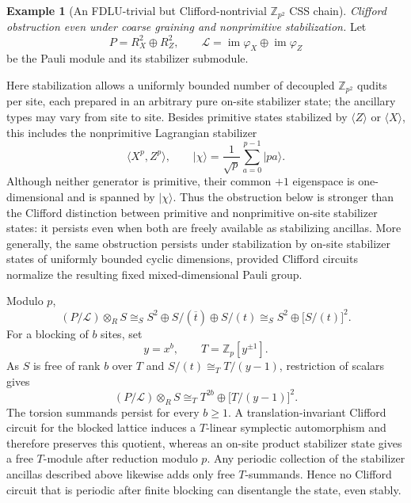 \documentclass[aps,prx,english,superscriptaddress,twocolumn,tightenlines,showpacs,longbibliography,floatfix,amsfonts]{revtex4-2}
\theoremstyle{remark}
\theoremstyle{definition}
\newtheorem{example}{Example}
\begin{document}
\begin{example}[An FDLU-trivial but Clifford-nontrivial \(\mathbb Z_{p^2}\) CSS chain]
	\emph{Clifford obstruction even under coarse graining and nonprimitive
	stabilization.}
	Let
	\begin{equation}
		P=R_X^2\oplus R_Z^2,
		\qquad
		\mathcal L=\operatorname{im}\varphi_X
		\oplus\operatorname{im}\varphi_Z
	\end{equation}
	be the Pauli module and its stabilizer submodule.

	Here stabilization allows a uniformly bounded number of decoupled
	$\mathbb Z_{p^2}$ qudits per site, each prepared in an arbitrary pure
	on-site stabilizer state; the ancillary types may vary from site to
	site. Besides primitive states stabilized by $\langle Z\rangle$ or
	$\langle X\rangle$, this includes the nonprimitive Lagrangian
	stabilizer
	\begin{equation}
		\langle X^p,Z^p\rangle,
		\qquad
		\lvert\chi\rangle
		=
		\frac{1}{\sqrt p}\sum_{a=0}^{p-1}\lvert pa\rangle.
	\end{equation}
	Although neither generator is primitive, their common \(+1\)
	eigenspace is one-dimensional and is spanned by $\lvert\chi\rangle$.
	Thus the obstruction below is stronger than the Clifford distinction
	between primitive and nonprimitive on-site stabilizer states: it
	persists even when both are freely available as stabilizing ancillas.
	More generally, the same obstruction persists under stabilization by
	on-site stabilizer states of uniformly bounded cyclic dimensions,
	provided Clifford circuits normalize the resulting fixed
	mixed-dimensional Pauli group.

	Modulo $p$,
	\begin{equation}
		(P/\mathcal L)\otimes_R S
		\cong_S
		S^2\oplus S/(\overline{t})\oplus S/(t)
		\cong_S
		S^2\oplus\bigl[S/(t)\bigr]^2.
	\end{equation}
	For a blocking of $b$ sites, set
	\begin{equation}
		y=x^b,
		\qquad
		T=\mathbb Z_p[y^{\pm1}].
	\end{equation}
	As \(S\) is free of rank \(b\) over \(T\) and
	\(S/(t)\cong_T T/(y-1)\), restriction of scalars gives
	\begin{equation}
		(P/\mathcal L)\otimes_R S
		\cong_T
		T^{2b}\oplus\bigl[T/(y-1)\bigr]^2.
	\end{equation}
	The torsion summands persist for every $b\geq1$. A
	translation-invariant Clifford circuit for the blocked lattice induces
	a $T$-linear symplectic automorphism and therefore preserves this
	quotient, whereas an on-site product stabilizer state gives a free
	$T$-module after reduction modulo $p$. Any periodic collection of the
	stabilizer ancillas described above likewise adds only free
	$T$-summands.
	Hence no Clifford circuit that is periodic after finite blocking can
	disentangle the state, even stably.


\end{example}
\end{document}
